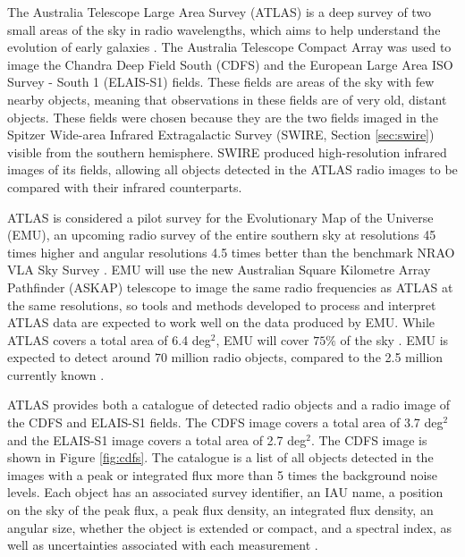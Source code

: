         The Australia Telescope Large Area Survey (ATLAS) is a deep  survey of two small areas of the sky in radio wavelengths, which aims to help understand the evolution of early galaxies \citep{norris06}. The Australia Telescope Compact Array was used to image the Chandra Deep Field South (CDFS) and the European Large Area ISO Survey - South 1 (ELAIS-S1) fields. These fields are areas of the sky with few nearby objects, meaning that observations in these fields are of very old, distant objects. These fields were chosen because they are the two fields imaged in the Spitzer Wide-area Infrared Extragalactic Survey (SWIRE, Section \ref{sec:swire}) visible from the southern hemisphere. SWIRE produced high-resolution infrared images of its fields, allowing all objects detected in the ATLAS radio images to be compared with their infrared counterparts.

        ATLAS is considered a pilot survey for the Evolutionary Map of the Universe (EMU), an upcoming radio survey of the entire southern sky at resolutions 45 times higher and angular resolutions 4.5 times better than the benchmark NRAO VLA Sky Survey \citep{norris11b}. EMU will use the new Australian Square Kilometre Array Pathfinder (ASKAP) telescope to image the same radio frequencies as ATLAS at the same resolutions, so tools and methods developed to process and interpret ATLAS data are expected to work well on the data produced by EMU. While ATLAS covers a total area of 6.4 deg$^2$, EMU will cover $75\%$ of the sky \citep{norris11b, norris16}. EMU is expected to detect around 70 million radio objects, compared to the 2.5 million currently known \citep{banfield15}.

        ATLAS provides both a catalogue of detected radio objects and a radio image of the CDFS and ELAIS-S1 fields. The CDFS image covers a total area of 3.7 deg$^2$ and the ELAIS-S1 image covers a total area of 2.7 deg$^2$. The CDFS image is shown in Figure \ref{fig:cdfs}. The catalogue is a list of all objects detected in the images with a peak or integrated flux more than 5 times the background noise levels. Each object has an associated survey identifier, an IAU name, a position on the sky of the peak flux, a peak flux density, an integrated flux density, an angular size, whether the object is extended or compact, and a spectral index, as well as uncertainties associated with each measurement \citep{franzen15}.


